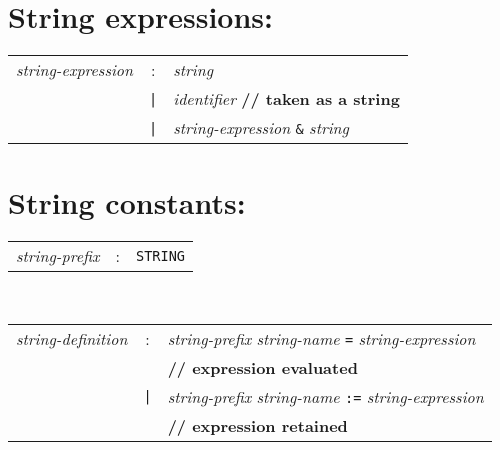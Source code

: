 \section*{String expressions:}
\begin{tabular}{p{4cm}cl}
\textit{string-expression}
  &:& \textit{string} \\
  &\texttt{|}& \textit{identifier} \textbf{// taken as a string} \\
  &\texttt{|}& \textit{string-expression} \texttt{\&} \textit{string}
\end{tabular}

\section*{String constants:}
\begin{tabular}{p{4cm}cl}
\textit{string-prefix}
  &:& \texttt{STRING}
\end{tabular}
\\
\begin{tabular}{p{4cm}cl}
\textit{string-definition}
  &:& \textit{string-prefix} \textit{string-name} \texttt{=}
    \textit{string-expression} \\
 & &\textbf{// expression evaluated} \\
  &\texttt{|}& \textit{string-prefix} \textit{string-name} \texttt{:=}
    \textit{string-expression} \\
 & &\textbf{// expression retained}
\end{tabular}

